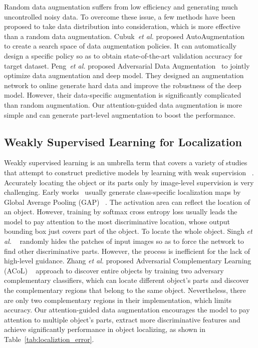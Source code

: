 \documentclass[10pt,twocolumn,letterpaper]{article}
\def\etal{{\em et al. }}
\begin{document}
Random data augmentation suffers from low efficiency and generating much uncontrolled noisy data. To overcome these issue, a few methods have been proposed to take data distribution into consideration, which is more effective than a random data augmentation. Cubuk~\etal proposed AutoAugmentation~\cite{auto_autment} to create a search space of data augmentation policies. It can automatically design a specific policy so as to obtain state-of-the-art validation accuracy for target dataset. Peng~\etal proposed Adversarial Data Augmentation~\cite{ada} to jointly optimize data augmentation and deep model. They designed an augmentation network to online generate hard data and improve the robustness of the deep model. However, their data-specific augmentation is significantly complicated than random augmentation. Our attention-guided data augmentation is more simple and can generate part-level augmentation to boost the performance.

\subsection{Weakly Supervised Learning for Localization}
Weakly supervised learning is an umbrella term that covers a variety of studies that attempt to construct predictive models by learning with weak supervision ~\cite{review:wsl}. Accurately locating the object or its parts only by image-level supervision is very challenging. Early works~\cite{box_predict,Zhang2016TopDownNA} usually generate class-specific localization maps by Global Average Pooling (GAP) ~\cite{nin}. The activation area can reflect the location of an object. However, training by softmax cross entropy loss usually leads the model to pay attention to the most discriminative location, whose output bounding box just covers part of the object. To locate the whole object. Singh \etal ~\cite{hide-and-seek} randomly hides the patches of input images so as to force the network to find other discriminative parts. However, the process is inefficient for the lack of high-level guidance. Zhang \etal proposed Adversarial Complementary Learning (ACoL) ~\cite{acol} approach to discover entire objects by training two adversary complementary classifiers, which can locate different object's parts and discover the complementary regions that belong to the same object. Nevertheless, there are only two complementary regions in their implementation, which limits accuracy.  Our attention-guided data augmentation encourages the model to pay attention to multiple object's parts, extract more discriminative features and achieve significantly performance in object localizing, as shown in Table~\ref{tab:localiztion_error}.
\end{document}
